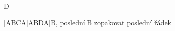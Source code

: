 \documentclass[timestamp]{jazzgrid}
\begin{document}
\begin{musicsection}{D}
\barline
	{\barfour{}
		{}
		{}
		{}
		{}
	}
	{\barfour{}
		{}
		{}
		{}
		{}
	}
	{\barfour{}
		{}
		{}
		{}
		{}
	}
	{\barfour{}
		{}
		{}
		{}
		{}
	}
\barline
	{\barfour{}
		{}
		{}
		{}
		{}
	}
	{\barfour{}
		{}
		{}
		{}
		{}
	}
	{\barfour{}
		{}
		{}
		{}
		{}
	}
	{\barfour{}
		{}
		{}
		{}
		{}
	}
\barline
	{\barfour{}
		{}
		{}
		{}
		{}
	}
	{\barfour{}
		{}
		{}
		{}
		{}
	}
	{\barfour{}
		{}
		{}
		{}
		{}
	}
	{\barfour{}
		{}
		{}
		{}
		{}
	}
\barline
	{\barfour{}
		{}
		{}
		{}
		{}
	}
	{\barfour{}
		{}
		{}
		{}
		{}
	}
	{\barfour{}
		{}
		{}
		{}
		{}
	}
	{\barfour{}
		{}
		{}
		{}
		{}
	}
\end{musicsection}
\tiny
|ABCA|ABDA|B, poslední B zopakovat poslední řádek
\end{document}
